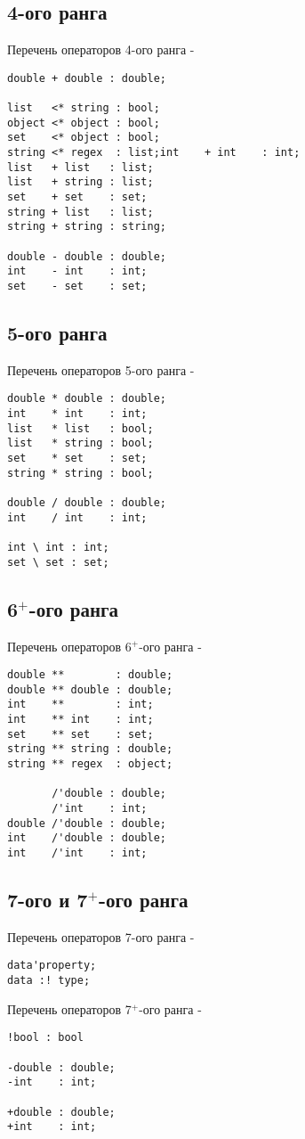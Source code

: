 \subsection{4-ого ранга}

\noindent Перечень операторов 4-ого ранга -
\begin{verbatim}
double + double : double;

list   <* string : bool;
object <* object : bool;
set    <* object : bool;
string <* regex  : list;int    + int    : int;
list   + list   : list;
list   + string : list;
set    + set    : set;
string + list   : list;
string + string : string;

double - double : double;
int    - int    : int;
set    - set    : set;
\end{verbatim}

\subsection{5-ого ранга}

\noindent Перечень операторов 5-ого ранга -
\begin{verbatim}
double * double : double;
int    * int    : int;
list   * list   : bool;
list   * string : bool;
set    * set    : set;
string * string : bool;

double / double : double;
int    / int    : int;

int \ int : int;
set \ set : set;
\end{verbatim}

\subsection{6$^+$-ого ранга}

\noindent Перечень операторов 6$^+$-ого ранга -
\begin{verbatim}
double **        : double;
double ** double : double;
int    **        : int;
int    ** int    : int;
set    ** set    : set;
string ** string : double;
string ** regex  : object;

       /'double : double;
       /'int    : int;
double /'double : double;
int    /'double : double;
int    /'int    : int;
\end{verbatim}

\subsection{7-ого и 7$^+$-ого ранга}

\noindent Перечень операторов 7-ого ранга -
\begin{verbatim}
data'property;
data :! type;
\end{verbatim}

\noindent Перечень операторов 7$^+$-ого ранга -
\begin{verbatim}
!bool : bool

-double : double;
-int    : int;

+double : double;
+int    : int;
\end{verbatim}

